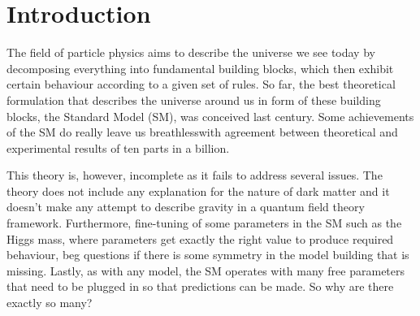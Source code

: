 \chapter{Introduction}



The field of particle physics aims to describe the universe we see today by decomposing everything into fundamental building blocks, which then exhibit certain behaviour according to a given set of rules. So far, the best theoretical formulation that describes the universe around us in form of these building blocks, the Standard Model (\Gls{SM}), was conceived last century. Some achievements of the \gls{SM} do really leave us breathless\DIFaddbegin \DIFadd{, }\DIFaddend with agreement between theoretical and experimental results of ten parts in a billion. 

This theory is, however, incomplete as it fails to address several issues. The theory does not include any explanation for the nature of dark matter and it doesn't make any attempt to describe gravity in a quantum field theory framework. Furthermore, fine-tuning of some parameters in the \gls{SM} such as the Higgs mass, where parameters get exactly the right value to produce required behaviour, beg questions if there is some symmetry in the model building that is missing. Lastly, as with any model, the \gls{SM} operates with many free parameters that need to be plugged in so that predictions can be made. So why are there exactly so many?

